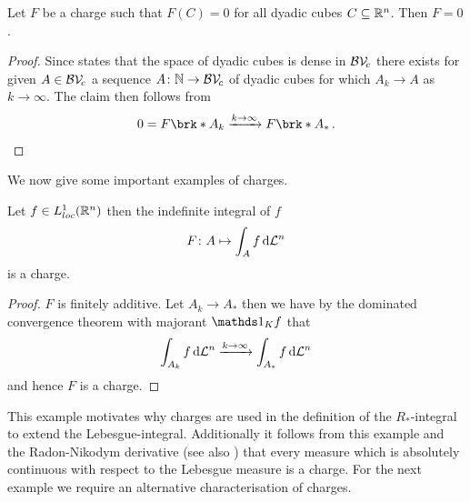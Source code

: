 \begin{lemma}\label{le:DensityCubes}
Let $F$ be a charge such that $F(C)=0$ for all dyadic cubes $C\subseteq\mathbb{R}^n$. Then $F=0$.
\end{lemma}
\begin{proof}
Since \cite[Corollary 1.10.4]{Pfe2001} states that the space of dyadic cubes is dense in $\mathcal{BV\!}_c$ there exists for given $A\in \mathcal{BV\!}_c$ a sequence $A\colon\mathbb{N}\to\mathcal{BV\!}_c$ of dyadic cubes for which $A_k\to A$ as $k\to\infty$. The claim then follows from
\begin{align*}
	0=F\brk*{A_k}\xrightarrow{k\to\infty}F\brk*{A_*}\,.
\end{align*}
\end{proof}

\noindent We now give some important examples of charges.

\begin{claim}
Let $f\in L^1_{loc}(\mathbb{R}^n)$ then the indefinite integral of $f$
\begin{align*}
	F\colon A\mapsto \int_Af\,\mathrm{d} \mathcal{L}^n
\end{align*}
is a charge.
\end{claim}
\begin{proof}
$F$ is finitely additive. Let $A_k\to A_*$ then we have by the dominated convergence theorem with majorant $\one_Kf$ that
\begin{align*}
	\int_{A_k}f\,\mathrm{d} \mathcal{L}^n\xrightarrow{k\to\infty}\int_{A_*}f\,\mathrm{d} \mathcal{L}^n
\end{align*}
and hence $F$ is a charge.
\end{proof}

\noindent This example motivates why charges are used in the definition of the $R_*$-integral to extend the Lebesgue-integral. Additionally it follows from this example and the Radon-Nikodym derivative (see also \cite[Chapter 4.2]{Coh2013}) that every measure which is absolutely continuous with respect to the Lebesgue measure is a charge. For the next example we require an alternative characterisation of charges.

